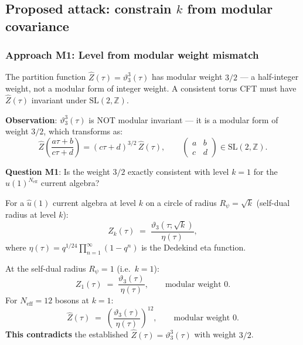 \documentclass[12pt,a4paper]{article}
\theoremstyle{definition}
\theoremstyle{remark}
\newcommand{\vth}{\vartheta}
\newcommand{\SL}{\mathrm{SL}(2,\mathbb{Z})}
\begin{document}
\subsection{Proposed attack: constrain $k$ from modular covariance}

\subsubsection*{Approach M1: Level from modular weight mismatch}

The partition function $\hat{Z}(\tau) = \vth_3^3(\tau)$ has modular weight
$3/2$ — a half-integer weight, not a modular form of integer weight.
A consistent torus CFT must have $\hat{Z}(\tau)$ invariant under
$\mathrm{SL}(2,\mathbb{Z})$.

\textbf{Observation}: $\vth_3^3(\tau)$ is NOT modular invariant — it is a
modular form of weight $3/2$, which transforms as:
\[
  \hat{Z}\!\left(\frac{a\tau+b}{c\tau+d}\right)
  = (c\tau+d)^{3/2}\,\hat{Z}(\tau), \qquad \begin{pmatrix}a&b\\c&d\end{pmatrix}\in\SL.
\]

\textbf{Question M1}: Is the weight $3/2$ exactly consistent with level $k=1$
for the $\hat{u}(1)^{N_{\mathrm{eff}}}$ current algebra?

For a $\hat{u}(1)$ current algebra at level $k$ on a circle of radius
$R_\psi = \sqrt{k}$ (self-dual radius at level $k$):
\[
  Z_k(\tau) \;=\; \frac{\vth_3(\tau;\sqrt{k})}{\eta(\tau)},
\]
where $\eta(\tau) = q^{1/24}\prod_{n=1}^\infty(1-q^n)$ is the Dedekind eta function.

At the self-dual radius $R_\psi = 1$ (i.e.\ $k=1$):
\[
  Z_1(\tau) \;=\; \frac{\vth_3(\tau)}{\eta(\tau)},
  \qquad \text{modular weight } 0.
\]
For $N_{\mathrm{eff}} = 12$ bosons at $k=1$:
\[
  \hat{Z}(\tau) \;=\; \left(\frac{\vth_3(\tau)}{\eta(\tau)}\right)^{12},
  \qquad \text{modular weight } 0.
\]
\textbf{This contradicts} the established $\hat{Z}(\tau) = \vth_3^3(\tau)$
with weight $3/2$.
\end{document}
